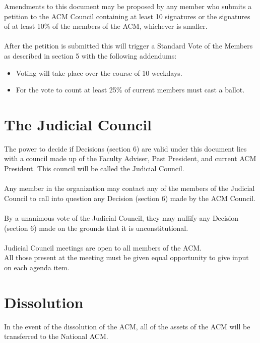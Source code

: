 \documentclass[12pt,titlepage]{article}
\begin{document}
Amendments to this document may be proposed by any member who submits a petition to the ACM Council containing at least 10 signatures or the signatures of at least 10\% of the members of the ACM, whichever is smaller.\\
\\
After the petition is submitted this will trigger a Standard Vote of the Members as described in section 5 with the following addendums:
\begin{itemize}
	\item Voting will take place over the course of 10 weekdays.
	\item For the vote to count at least 25\% of current members must cast a ballot.
\end{itemize}

\section{The Judicial Council}

The power to decide if Decisions (section 6) are valid under this document lies with a council made up of the Faculty Adviser, Past President, and current ACM President. This council will be called the Judicial Council.\\
\\
Any member in the organization may contact any of the members of the Judicial Council to call into question any Decision (section 6) made by the ACM Council.\\
\\
By a unanimous vote of the Judicial Council, they may nullify any Decision (section 6) made on the grounds that it is unconstitutional.\\
\\
Judicial Council meetings are open to all members of the ACM.\\
All those present at the meeting must be given equal opportunity to give input on each agenda item.

\section{Dissolution}

In the event of the dissolution of the ACM, all of the assets of the ACM will be transferred to the National ACM.
\end{document}
